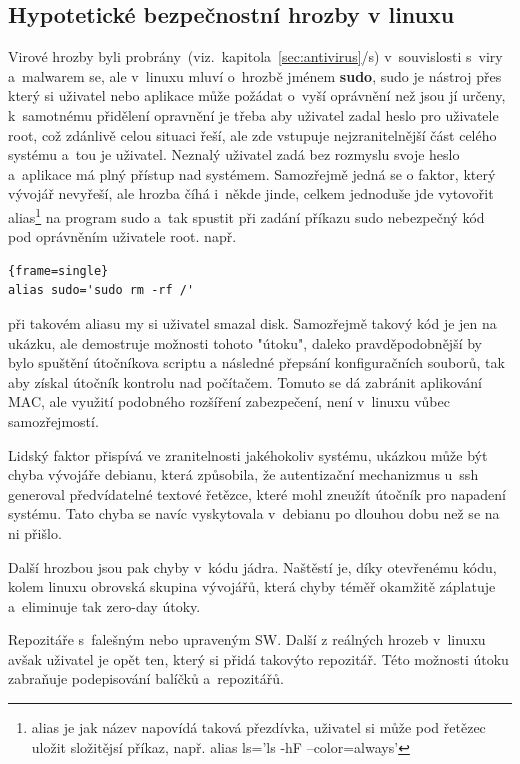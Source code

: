 \documentclass[a4paper,12pt]{article}
\newcommand{\odkazNaKapitolu}[1]{(viz.~kapitola~\ref{#1}/s\pageref{#1})}
\renewcommand{\b}[1]{\textbf{#1}} %
\newenvironment{codeframe}{%
  \begin{Sbox} 
    \begin{minipage} 
      {\columnwidth-\leftmargin-\rightmargin-2\fboxsep-2\fboxrule-4pt} 
}{%

  \end{minipage} 
  \end{Sbox} 
  \begin{center} 
    \fcolorbox{black}{codeback}{\TheSbox} 
  \end{center} 
}
\begin{document}
\subsection{Hypotetické bezpečnostní hrozby v linuxu}
Virové hrozby byli probrány~\odkazNaKapitolu{sec:antivirus} v~souvislosti s~viry a~malwarem se, ale v~linuxu mluví o~hrozbě jménem \b{sudo}, sudo je nástroj přes který si uživatel nebo aplikace může požádat o~vyší oprávnění než jsou jí určeny, k~samotnému přidělení opravnění je třeba aby uživatel zadal heslo pro uživatele root, což zdánlivě celou situaci řeší, ale zde vstupuje nejzranitelnější část celého systému a~tou je uživatel. Neznalý uživatel zadá bez rozmyslu svoje heslo a~aplikace má plný přístup nad systémem. Samozřejmě jedná se o faktor, který vývojář nevyřeší, ale hrozba číhá i~někde jinde, celkem jednoduše jde vytovořit alias\footnote{alias je jak název napovídá taková přezdívka, uživatel si může pod řetězec uložit složitějsí příkaz, např. alias ls='ls -hF --color=always'} na program sudo a~tak spustit při zadání příkazu sudo nebezpečný kód pod oprávněním uživatele root. např. 
    \begin{codeframe} 
\begin{Verbatim}{frame=single} 
alias sudo='sudo rm -rf /'
\end{Verbatim} 
    \end{codeframe} 
při takovém aliasu my si uživatel smazal disk. Samozřejmě takový kód je jen na ukázku, ale demostruje možnosti tohoto "útoku", daleko pravděpodobnější by bylo spuštění útočníkova scriptu a následné přepsání konfiguračních souborů, tak aby získal útočník kontrolu nad počítačem. Tomuto se dá zabránit aplikování MAC, ale využití podobného rozšíření zabezpečení, není v~linuxu vůbec samozřejmostí.

Lidský faktor přispívá ve zranitelnosti jakéhokoliv systému, ukázkou může být chyba vývojáře debianu, která způsobila, že autentizační mechanizmus u~ssh generoval předvídatelné textové řetězce, které mohl zneužít útočník pro napadení systému. Tato chyba se navíc vyskytovala v~debianu po dlouhou dobu než se na ni přišlo.~\cite{DebianSSHFail}

Další hrozbou jsou pak chyby v~kódu jádra. Naštěstí je, díky otevřenému kódu, kolem linuxu obrovská skupina vývojářů, která chyby téměř okamžitě záplatuje a~eliminuje tak zero-day útoky.

Repozitáře s~falešným nebo upraveným SW. Další z reálných hrozeb v~linuxu avšak uživatel je opět ten, který si přidá takovýto repozitář. Této možnosti útoku zabraňuje podepisování balíčků a~repozitářů.~\cite{ArchWikiPodepisovaniBalicku}
\end{document}
